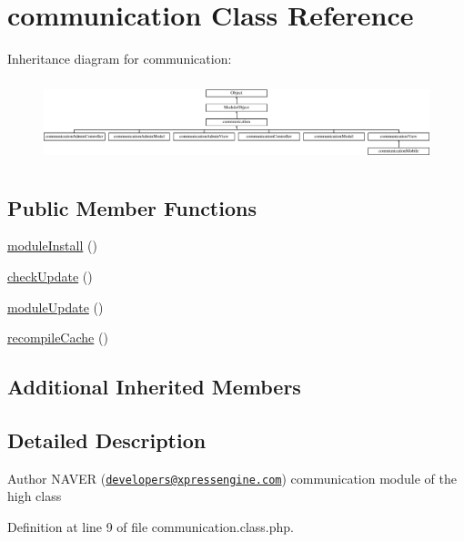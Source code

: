 \hypertarget{classcommunication}{}\section{communication Class Reference}
\label{classcommunication}
Inheritance diagram for communication\+:\begin{figure}[H]
\begin{center}
\leavevmode
\includegraphics[height=2.405498cm]{classcommunication}
\end{center}
\end{figure}
\subsection*{Public Member Functions}
\begin{DoxyCompactItemize}
\item 
\hyperlink{classcommunication_aa976c35c62e0e28be160893825f4e7a6}{module\+Install} ()
\item 
\hyperlink{classcommunication_a76f080661ce31bd72c02bb41c8d5714f}{check\+Update} ()
\item 
\hyperlink{classcommunication_a10cbff2a979531d279954a22b8455061}{module\+Update} ()
\item 
\hyperlink{classcommunication_a79303a25f2f20a3bdd40f6af4b8f9a52}{recompile\+Cache} ()
\end{DoxyCompactItemize}
\subsection*{Additional Inherited Members}


\subsection{Detailed Description}
\begin{DoxyAuthor}{Author}
N\+A\+V\+ER (\href{mailto:developers@xpressengine.com}{\tt developers@xpressengine.\+com}) communication module of the high class 
\end{DoxyAuthor}


Definition at line 9 of file communication.\+class.\+php.



